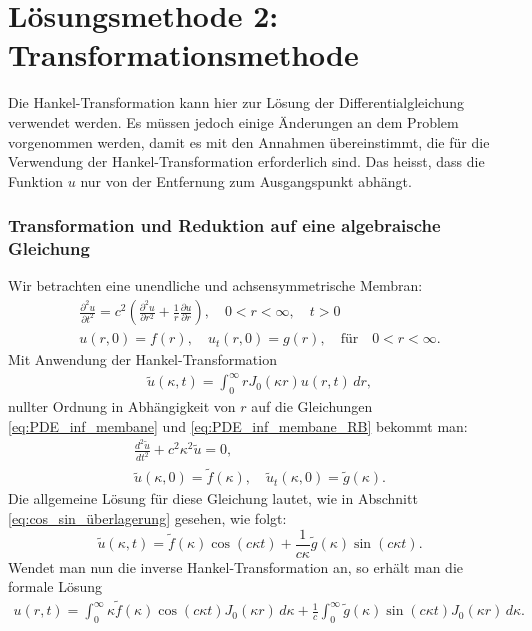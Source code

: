 %
%
%
\section{Lösungsmethode 2: Transformationsmethode
\label{kreismembran:section:teil3}}
Die Hankel-Transformation kann hier zur Lösung der Differentialgleichung verwendet werden. Es müssen jedoch einige Änderungen an dem Problem vorgenommen werden, damit es mit den Annahmen übereinstimmt, die für die Verwendung der Hankel-Transformation erforderlich sind. Das heisst, dass die Funktion $u$ nur von der Entfernung zum Ausgangspunkt abhängt. 

\subsubsection{Transformation und Reduktion auf eine algebraische Gleichung
\label{subsub:transf_reduktion}}
Wir betrachten eine
unendliche und achsensymmetrische Membran:
\begin{align}
	\frac{\partial^2u}{\partial t^2}
	=
	c^2  \left(\frac{\partial^2 u}{\partial r^2}
	+
	\frac{1}{r}
	\frac{\partial u}{\partial r} \right), \quad 0<r<\infty, \quad t>0   \label{eq:PDE_inf_membane} \\
		u(r,0)=f(r), \quad u_t(r,0) = g(r), \quad \text{für} \quad 0<r<\infty.
	\label{eq:PDE_inf_membane_RB}
\end{align}
Mit Anwendung der Hankel-Transformation
\begin{align}
	\tilde{u}(\kappa,t)=\int_{0}^{\infty}r J_0(\kappa r)u(r,t) \, dr,
\end{align}
nullter Ordnung in Abhängigkeit von $r$ 
auf die Gleichungen \eqref{eq:PDE_inf_membane} und \eqref{eq:PDE_inf_membane_RB}
bekommt man:
\begin{gather*}
	\frac{d^2 \tilde{u}}{dt^2} + c^2\kappa^2\tilde{u}=0,
\\
	\tilde{u}(\kappa,0)=\tilde{f}(\kappa), \quad 
	\tilde{u}_t(\kappa,0)=\tilde{g}(\kappa).
\end{gather*}
Die allgemeine Lösung für diese Gleichung lautet, wie in Abschnitt \eqref{eq:cos_sin_überlagerung} gesehen, wie folgt:
\begin{equation*}
	\tilde{u}(\kappa,t)=\tilde{f}(\kappa)\cos(c\kappa t) + \frac{1}{c\kappa}\tilde{g}(\kappa)\sin(c\kappa t).
\end{equation*}
Wendet man nun die inverse Hankel-Transformation an, so erhält man
die formale Lösung
\begin{align}
	u(r,t)=\int_{0}^{\infty}\kappa\tilde{f}(\kappa)\cos(c\kappa t) J_0(\kappa r) \, d\kappa +\frac{1}{c}\int_{0}^{\infty}\tilde{g}(\kappa)\sin(c\kappa t)J_0(\kappa r) \, d\kappa.
	\label{eq:formale_lösung}
\end{align}

